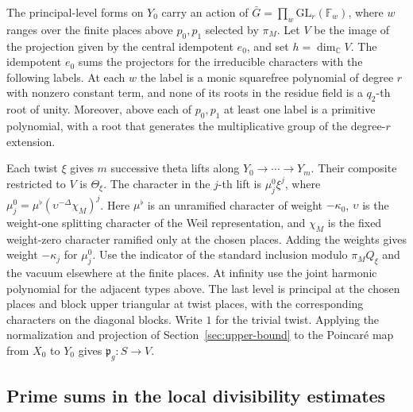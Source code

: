 The principal-level forms on \(Y_0\) carry an action of
\(\bar G=\prod_w\mathrm{GL}_r(\mathbb F_w)\), where \(w\) ranges over the
finite places above \(p_0,p_1\) selected by \(\pi_M\).
Let \(V\) be the image of the projection given by the central idempotent
\(e_0\), and set \(h=\dim_{\mathbb C}V\).
The idempotent \(e_0\) sums the projectors for the irreducible characters
with the following labels. At each \(w\) the label is a monic squarefree
polynomial of degree \(r\) with nonzero constant term, and none of its
roots in the residue field is a \(q_2\)-th root of unity.
Moreover, above each of \(p_0,p_1\) at least one label is a primitive
polynomial, with a root that generates the multiplicative group of the
degree-\(r\) extension.

Each twist \(\xi\) gives \(m\) successive theta lifts along
\(Y_0\to\cdots\to Y_m\). Their composite restricted to \(V\) is \(\Theta_\xi\).
The character in the \(j\)-th lift is \(\mu_j^0\xi^j\), where
\(\mu_j^0=\mu^\flat(\upsilon^{-\Delta}\chi_M)^j\).
Here \(\mu^\flat\) is an unramified character of weight \(-\kappa_0\),
\(\upsilon\) is the weight-one splitting character of the Weil representation,
and \(\chi_M\) is the fixed weight-zero character ramified only at the chosen
places. Adding the weights gives weight \(-\kappa_j\) for \(\mu_j^0\).
Use the indicator of the standard inclusion modulo \(\pi_M Q_\xi\)
and the vacuum elsewhere at the finite places. At infinity use
the joint harmonic polynomial for the adjacent types above.
The last level is principal at the chosen places and block upper
triangular at twist places, with the corresponding characters on
the diagonal blocks.
Write \(1\) for the trivial twist. Applying the normalization and projection of
Section~\ref{sec:upper-bound} to the Poincar\'e map from \(X_0\) to \(Y_0\) gives
\(\mathfrak p_g\colon S\to V\).

\subsection{Prime sums in the local divisibility estimates}

